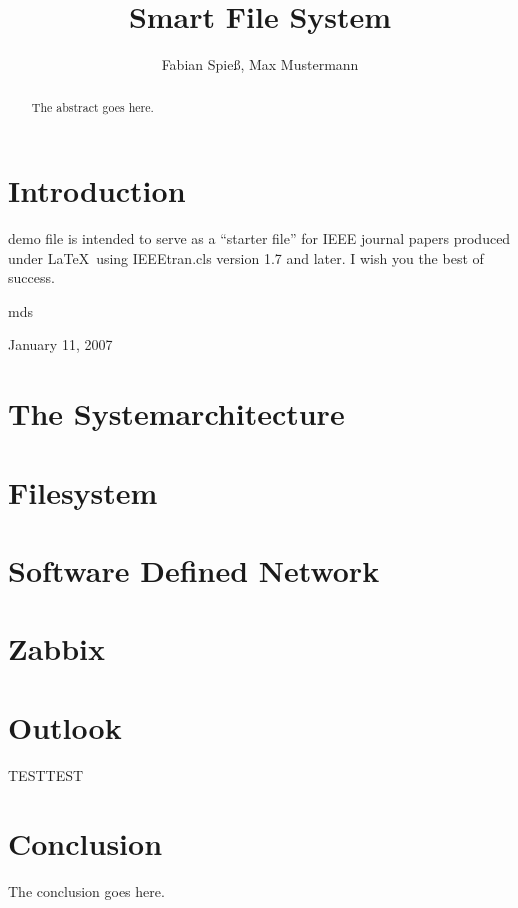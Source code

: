 \documentclass[journal]{IEEEtran}
\begin{document}
\title{Smart File System}

\author{Fabian Spie\ss, Max Mustermann}
        
\maketitle


\begin{abstract}
The abstract goes here.
\end{abstract}

\IEEEpeerreviewmaketitle

\tableofcontents


\section{Introduction}
 demo file is intended to serve as a ``starter file''
for IEEE journal papers produced under \LaTeX\ using
IEEEtran.cls version 1.7 and later.
I wish you the best of success.

\hfill mds
 
\hfill January 11, 2007

\section{The Systemarchitecture}



\section{Filesystem}


\section{Software Defined Network}


\section{Zabbix}



\section{Outlook}

TESTTEST

\section{Conclusion}
The conclusion goes here.
\end{document}
